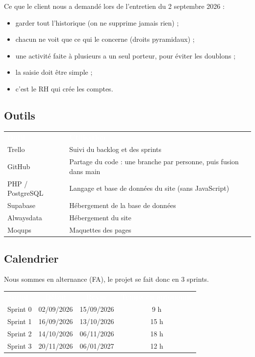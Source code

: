 \documentclass[11pt,a4paper]{article}
\newcommand{\entete}[1]{\textcolor{white}{\textbf{#1}}}
\begin{document}
Ce que le client nous a demandé lors de l'entretien du 2 septembre 2026 :
\begin{itemize}
  \item garder tout l'historique (on ne supprime jamais rien) ;
  \item chacun ne voit que ce qui le concerne (droits pyramidaux) ;
  \item une activité faite à plusieurs a un seul porteur, pour éviter les doublons ;
  \item la saisie doit être simple ;
  \item c'est le RH qui crée les comptes.
\end{itemize}

\subsection{Outils}

\begin{center}
\begin{tabular}{l p{11cm}}
\rowcolor{bleu} \entete{Outil} & \entete{Utilisation} \\
Trello & Suivi du backlog et des sprints \\
\rowcolor{grisclair} GitHub & Partage du code : une branche par personne, puis fusion dans main \\
PHP / PostgreSQL & Langage et base de données du site (sans JavaScript) \\
\rowcolor{grisclair} Supabase & Hébergement de la base de données \\
Alwaysdata & Hébergement du site \\
\rowcolor{grisclair} Moqups & Maquettes des pages \\
\end{tabular}
\end{center}

\subsection{Calendrier}

Nous sommes en alternance (FA), le projet se fait donc en 3 sprints.

\begin{center}
\begin{tabular}{l c c c}
\rowcolor{bleu} \entete{Sprint} & \entete{Début} & \entete{Revue} & \entete{Temps en autonomie} \\
Sprint 0 & 02/09/2026 & 15/09/2026 & 9 h \\
\rowcolor{grisclair} Sprint 1 & 16/09/2026 & 13/10/2026 & 15 h \\
Sprint 2 & 14/10/2026 & 06/11/2026 & 18 h \\
\rowcolor{grisclair} Sprint 3 & 20/11/2026 & 06/01/2027 & 12 h \\
\end{tabular}
\end{center}
\end{document}
